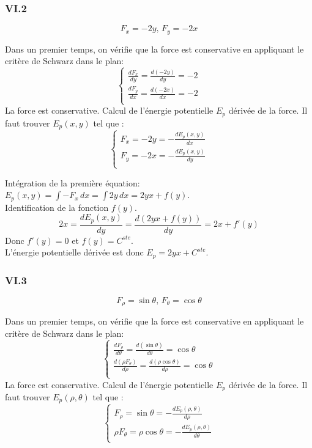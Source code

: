 \documentclass[]{book}
\theoremstyle{definition}
\begin{document}
\subsubsection*{VI.2}
$$F_x = -2y,\, F_y = -2x$$

Dans un premier temps, on v\'erifie que la force est conservative en appliquant le crit\`ere de Schwarz dans le plan:
$$
\left\{
\begin{array}{l }
	\frac{dF_x}{dy} = \frac{d(-2y)}{dy} = -2\\
	\frac{dF_y}{dx} = \frac{d(-2x)}{dx} = -2\\
\end{array}
\right. 
$$
La force est conservative. Calcul de l'\'energie potentielle $E_p$ d\'eriv\'ee de la force. Il faut trouver $E_p(x,y)$ tel que :
$$
\left\{
\begin{array}{l }
	F_x = -2y = -\frac{dE_p(x,y)}{dx} \\
	F_y =  -2x = -\frac{dE_p(x,y)}{dy} \\
\end{array}
\right. 
$$

Int\'egration de la premi\`ere \'equation: $E_p(x,y) = \int{-F_x\, dx} = \int{2y\, dx} = 2yx + f(y)$.\\
Identification de la fonction $f(y)$. 
$$2x = \frac{dE_p(x,y)}{dy} = \frac{d(2yx+f(y))}{dy} = 2x+f'(y)$$
Donc $f'(y) = 0$ et $f(y) = C^{ste}$.\\

L'\'energie potentielle d\'eriv\'ee est donc $E_p = 2yx + C^{ste}$.

\subsubsection*{VI.3}
$$F_{\rho} = \sin \theta,\, F_{\theta} = \cos \theta$$

Dans un premier temps, on v\'erifie que la force est conservative en appliquant le crit\`ere de Schwarz dans le plan:
$$
\left\{
\begin{array}{l }
	\frac{dF_{\rho}}{d\theta} = \frac{d(\sin \theta)}{d\theta} = \cos \theta\\
	\frac{d(\rho F_{\theta})}{d\rho} = \frac{d(\rho \cos \theta)}{d\rho} = \cos \theta\\
\end{array}
\right. 
$$
La force est conservative. Calcul de l'\'energie potentielle $E_p$ d\'eriv\'ee de la force. Il faut trouver $E_p(\rho,\theta)$ tel que :
$$
\left\{
\begin{array}{l }
	F_{\rho} = \sin \theta = -\frac{dE_p(\rho,\theta)}{d\rho} \\
	\rho F_{\theta} =  \rho \cos \theta = -\frac{dE_p(\rho,\theta)}{d\theta} \\
\end{array}
\right. 
$$
\end{document}
